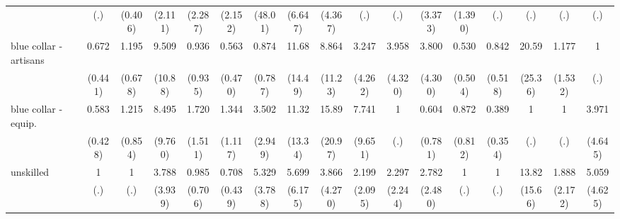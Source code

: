 {\begin{tabular}{l*{16}{c}}
                    &         (.)         &     (0.406)         &     (2.111)         &     (2.287)         &     (2.152)         &     (48.01)         &     (6.647)         &     (4.367)         &         (.)         &         (.)         &     (3.373)         &     (1.390)         &         (.)         &         (.)         &         (.)         &         (.)         \\
[1em]
blue collar - artisans&       0.672         &       1.195         &       9.509\sym{*}  &       0.936         &       0.563         &       0.874         &       11.68\sym{*}  &       8.864         &       3.247         &       3.958         &       3.800         &       0.530         &       0.842         &       20.59\sym{*}  &       1.177         &           1         \\
                    &     (0.441)         &     (0.678)         &     (10.88)         &     (0.935)         &     (0.470)         &     (0.787)         &     (14.49)         &     (11.23)         &     (4.262)         &     (4.320)         &     (4.300)         &     (0.504)         &     (0.518)         &     (25.36)         &     (1.532)         &         (.)         \\
[1em]
blue collar - equip.&       0.583         &       1.215         &       8.495         &       1.720         &       1.344         &       3.502         &       11.32\sym{*}  &       15.89\sym{*}  &       7.741         &           1         &       0.604         &       0.872         &       0.389         &           1         &           1         &       3.971         \\
                    &     (0.428)         &     (0.854)         &     (9.760)         &     (1.511)         &     (1.117)         &     (2.949)         &     (13.34)         &     (20.97)         &     (9.651)         &         (.)         &     (0.781)         &     (0.812)         &     (0.354)         &         (.)         &         (.)         &     (4.645)         \\
[1em]
unskilled           &           1         &           1         &       3.788         &       0.985         &       0.708         &       5.329\sym{*}  &       5.699         &       3.866         &       2.199         &       2.297         &       2.782         &           1         &           1         &       13.82\sym{*}  &       1.888         &       5.059         \\
                    &         (.)         &         (.)         &     (3.939)         &     (0.706)         &     (0.439)         &     (3.788)         &     (6.175)         &     (4.270)         &     (2.095)         &     (2.244)         &     (2.480)         &         (.)         &         (.)         &     (15.66)         &     (2.172)         &     (4.625)         \\

\end{tabular}}

